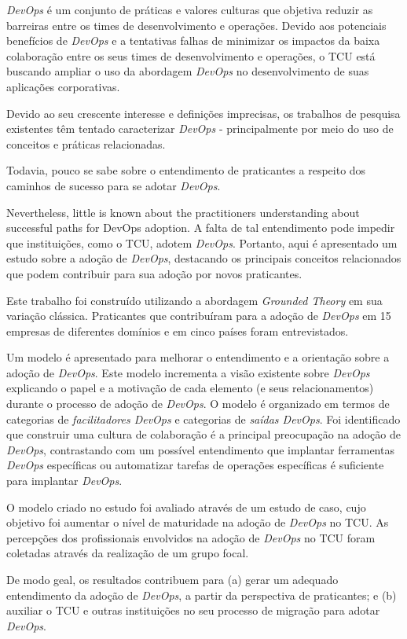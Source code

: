 \textit{DevOps} é um conjunto de práticas e valores culturas que objetiva
reduzir as barreiras entre os times de desenvolvimento e operações. Devido aos
potenciais benefícios de \textit{DevOps} e a tentativas falhas de minimizar os
impactos da baixa colaboração entre os seus times de desenvolvimento e operações,
o \acrshort{TCU} está buscando ampliar o uso da abordagem \textit{DevOps} no
desenvolvimento de suas aplicações corporativas.

Devido ao seu crescente interesse e definições imprecisas, os trabalhos de
pesquisa existentes têm tentado caracterizar \textit{DevOps} - principalmente
por meio do uso de conceitos e práticas relacionadas.

Todavia, pouco se sabe sobre o entendimento de praticantes a respeito dos caminhos
de sucesso para se adotar \textit{DevOps}.

Nevertheless, little is known about the practitioners understanding about
successful paths for DevOps adoption. A falta de tal entendimento pode impedir
que instituições, como o \acrshort{TCU}, adotem \textit{DevOps}. Portanto, aqui
é apresentado um estudo sobre a adoção de \textit{DevOps}, destacando os
principais conceitos relacionados que podem contribuir para sua adoção por
novos praticantes.

Este trabalho foi construído utilizando a abordagem \textit{Grounded Theory} em
sua variação clássica. Praticantes que contribuíram para a adoção de \textit{DevOps}
em 15 empresas de diferentes domínios e em cinco países foram entrevistados.

Um modelo é apresentado para melhorar o entendimento e a orientação sobre a
adoção de \textit{DevOps}. Este modelo incrementa a visão existente sobre
\textit{DevOps} explicando o papel e a motivação de cada elemento (e seus
relacionamentos) durante o processo de adoção de \textit{DevOps}. O modelo é
organizado em termos de categorias de \emph{facilitadores DevOps} e categorias
de \emph{saídas DevOps}. Foi identificado que construir uma cultura de
colaboração é a principal preocupação na adoção de \textit{DevOps}, contrastando
com um possível entendimento que implantar ferramentas \textit{DevOps} específicas
ou automatizar tarefas de operações específicas é suficiente para implantar
\textit{DevOps}.

O modelo criado no estudo foi avaliado através de um estudo de caso, cujo objetivo
foi aumentar o nível de maturidade na adoção de \textit{DevOps} no \acrshort{TCU}.
As percepções dos profissionais envolvidos na adoção de \textit{DevOps} no
\acrshort{TCU} foram coletadas através da realização de um grupo focal.

De modo geal, os resultados contribuem para (a) gerar um adequado entendimento
da adoção de \textit{DevOps}, a partir da perspectiva de praticantes; e (b)
auxiliar o \acrshort{TCU} e outras instituições no seu processo de migração para
adotar \textit{DevOps}.
